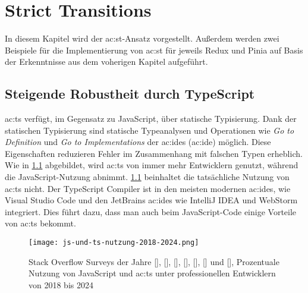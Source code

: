 \chapter{Strict Transitions} \label{ch:strict-transitions}

In diesem Kapitel wird der \acrlong{ac:st}-Ansatz vorgestellt. Außerdem werden zwei Beispiele für die Implementierung von \acrshort{ac:st} für jeweils Redux und Pinia auf Basis der Erkenntnisse aus dem voherigen Kapitel aufgeführt.

\section{Steigende Robustheit durch TypeScript}

\acrlong{ac:ts} verfügt, im Gegensatz zu JavaScript, über statische Typisierung. Dank der statischen Typisierung sind statische Typeanalysen und Operationen wie \textit{Go to Definition} und \textit{Go to Implementations} der \acrlong{ac:ide}s (\acrshort{ac:ide}) möglich. Diese Eigenschaften reduzieren Fehler im Zusammenhang mit falschen Typen erheblich. Wie in \ref{fig:js-und-ts-nutzung-2018-2024} abgebildet, wird \acrlong{ac:ts} von immer mehr Entwicklern genutzt, während die JavaScript-Nutzung abnimmt. \ref{fig:js-und-ts-nutzung-2018-2024} beinhaltet die tatsächliche Nutzung von \acrshort{ac:ts} nicht. Der TypeScript Compiler ist in den meisten modernen \acrshort{ac:ide}s, wie Visual Studio Code und den JetBrains \acrshort{ac:ide}s wie IntelliJ IDEA und WebStorm integriert. Dies führt dazu, dass man auch beim JavaScript-Code einige Vorteile von \acrlong{ac:ts} bekommt.\cite{typeScriptDocumentary}

\begin{figure}[H]
  \texttt{[image: js-und-ts-nutzung-2018-2024.png]}
  \caption{Stack Overflow Surveys der Jahre
  [\citeyear{stackOverflowSurvey2018MostPopularTechnologies}],
  [\citeyear{stackOverflowSurvey2019MostPopularTechnologies}],
  [\citeyear{stackOverflowSurvey2020MostPopularTechnologies}],
  [\citeyear{stackOverflowSurvey2021MostPopularTechnologies}],
  [\citeyear{stackOverflowSurvey2022MostPopularTechnologies}],
  [\citeyear{stackOverflowSurvey2023MostPopularTechnologies}] und
  [\citeyear{stackOverflowSurvey2024MostPopularTechnologies}], Prozentuale Nutzung von JavaScript und \acrlong{ac:ts} unter professionellen Entwicklern von 2018 bis 2024}
  \label{fig:js-und-ts-nutzung-2018-2024}
\end{figure}

